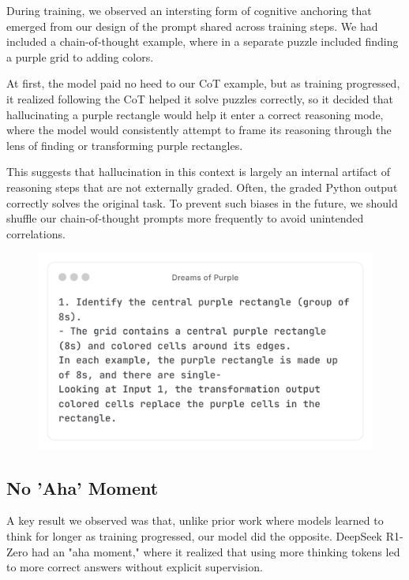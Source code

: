 \documentclass{article}
\begin{document}
During training, we observed an intersting form of cognitive anchoring that emerged from our design of the prompt shared across training steps. We had included a chain-of-thought example, where in a separate puzzle included finding a purple grid to adding colors.

At first, the model paid no heed to our CoT example, but as training progressed, it realized following the CoT helped it solve puzzles correctly, so it decided that hallucinating a purple rectangle would help it enter a correct reasoning mode, where the model would consistently attempt to frame its reasoning through the lens of finding or transforming purple rectangles.

This suggests that hallucination in this context is largely an internal artifact of reasoning steps that are not externally graded. Often, the graded Python output correctly solves the original task. To prevent such biases in the future, we should shuffle our chain-of-thought prompts more frequently to avoid unintended correlations.

\begin{figure}[t]
  \centering
  \includegraphics[width=0.95\columnwidth]{bin/purple.png}
  \label{fig:purple}
\end{figure}

\subsection{No 'Aha' Moment}

A key result we observed was that, unlike prior work where models learned to think for longer as training progressed, our model did the opposite. DeepSeek R1-Zero \cite{r1} had an "aha moment," where it realized that using more thinking tokens led to more correct answers without explicit supervision.
\end{document}
